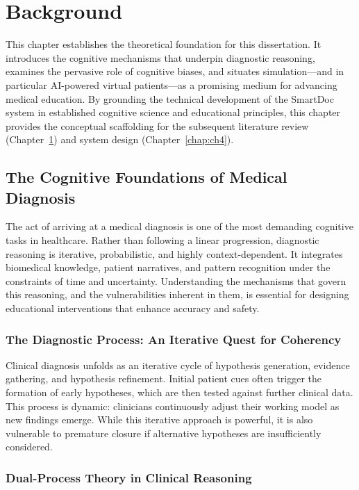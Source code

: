 \chapter{Background} \label{chap:ch3}

This chapter establishes the theoretical foundation for this dissertation. It introduces the cognitive mechanisms that underpin diagnostic reasoning, examines the pervasive role of cognitive biases, and situates simulation---and in particular AI-powered virtual patients---as a promising medium for advancing medical education. By grounding the technical development of the SmartDoc system in established cognitive science and educational principles, this chapter provides the conceptual scaffolding for the subsequent literature review (Chapter~\ref{chap:ch3}) and system design (Chapter~\ref{chap:ch4}).

\section{The Cognitive Foundations of Medical Diagnosis}

The act of arriving at a medical diagnosis is one of the most demanding cognitive tasks in healthcare. Rather than following a linear progression, diagnostic reasoning is iterative, probabilistic, and highly context-dependent. It integrates biomedical knowledge, patient narratives, and pattern recognition under the constraints of time and uncertainty. Understanding the mechanisms that govern this reasoning, and the vulnerabilities inherent in them, is essential for designing educational interventions that enhance accuracy and safety.

\subsection{The Diagnostic Process: An Iterative Quest for Coherency} \label{sec:se211}

Clinical diagnosis unfolds as an iterative cycle of hypothesis generation, evidence gathering, and hypothesis refinement. Initial patient cues often trigger the formation of early hypotheses, which are then tested against further clinical data. This process is dynamic: clinicians continuously adjust their working model as new findings emerge. While this iterative approach is powerful, it is also vulnerable to premature closure if alternative hypotheses are insufficiently considered.

\subsection{Dual-Process Theory in Clinical Reasoning} \label{sec:se311}

